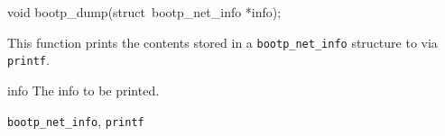 %
%
\begin{apisyn}

	\funcproto void bootp_dump(struct~bootp_net_info *info);
\end{apisyn}
\begin{apidesc}
	This function prints the contents stored in a
	\texttt{bootp_net_info} structure to via \texttt{printf}.
\end{apidesc}
\begin{apiparm}
	\item[info]
		The \bootp{} info to be printed.
\end{apiparm}
\begin{apirel}
	\texttt{bootp_net_info},
	\texttt{printf}
\end{apirel}
